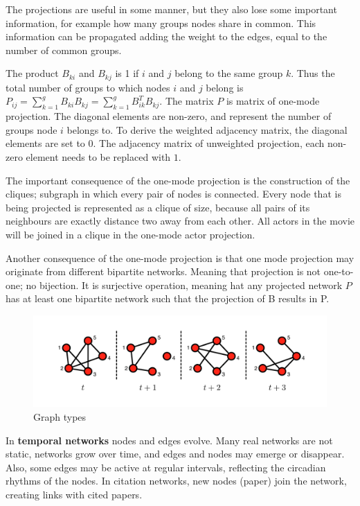 The projections are useful in some manner, but they also lose some important information, for example how many groups nodes share in common. This information can be propagated adding the weight to the edges, equal to the number of common groups.

The product $B_{ki}$ and $B_{kj}$ is 1 if $i$ and $j$ belong to the same group $k$. Thus the total number of groups to which nodes $i$ and $j$ belong is $P_{ij} = \sum_{k=1}^g B_{ki}B_{kj} = \sum_{k=1}^g B_{ik}^TB_{kj}$. The matrix $P$ is matrix of one-mode projection. The diagonal elements are non-zero, and represent the number of groups node $i$ belongs to.  To derive the weighted adjacency matrix, the diagonal elements are set to 0. The adjacency matrix of unweighted projection, each non-zero element needs to be replaced with $1$. 

The important consequence of the one-mode projection is the construction of the cliques; subgraph in which every pair of nodes is connected. Every node that is being projected is represented as a clique of size, because all pairs of its neighbours are exactly distance two away from each other. All actors in the movie will be joined in a clique in the one-mode actor projection. %

Another consequence of the one-mode projection is that one mode projection may originate from different bipartite networks. Meaning that projection is not one-to-one; no bijection. It is surjective operation, meaning hat any projected network $P$ has at least one bipartite network such that the projection of B results in P. \\ %

\begin{figure}[h!]
	\centering
	\includegraphics[width=1\linewidth]{figures/methodology/graph4.png} 
	\caption{Graph types}
	\label{fig:gt3}
\end{figure}

In \textbf{temporal networks} nodes and edges evolve. Many real networks are not static, networks grow over time, and edges and nodes may emerge or disappear. Also, some edges may be active at regular intervals, reflecting the circadian rhythms of the nodes. In citation networks, new nodes (paper) join the network, creating links with cited papers. 

